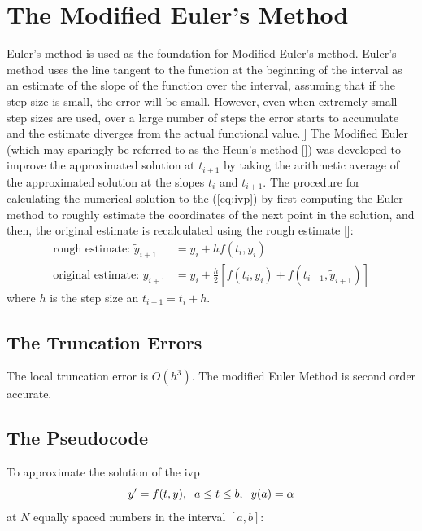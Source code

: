 \documentclass[12pt,oneside]{book}
\begin{document}
	\section{The Modified Euler's Method} \label{m:meul}
		\begin{spacing}{1.2}
			
			Euler's method is used as the foundation for Modified Euler's method. Euler's method uses the line tangent to the function at the beginning of the interval as an estimate of the slope of the function over the interval, assuming that if the step size is small, the error will be small. However, even when extremely small step sizes are used, over a large number of steps the error starts to accumulate and the estimate diverges from the actual functional value.[] \newline
			The Modified Euler (which may sparingly be referred to as the Heun's method []) was developed to improve the approximated solution at $t_{i+1}$ by taking the arithmetic average of the approximated solution at the slopes $t_{i}$ and $t_{i+1}$. \newline
			The procedure for calculating the numerical solution to the (\ref{eq:ivp}) by first computing the Euler method to roughly estimate the coordinates of the next point in the solution, and then, the original estimate is recalculated using the rough estimate []:
				\begin{equation}
					\begin{split}
						\text{rough estimate: } \tilde{y}_{i+1} & = y_{i} + hf(t_{i}, y_{i}) \\
						\text{original estimate: } y_{i+1} & = y_{i} + \frac{h}{2} \left[f(t_{i}, y_{i}) + f(t_{i+1}, \tilde{y}_{i+1}) \right]
					\end{split}
				\end{equation}
				where $ h $ is the step size an $ t_{i+1} = t_{i} + h. $
			
			\subsection*{The Truncation Errors}
				The local truncation error is $ O(h^{3}) $. The modified Euler Method is second order accurate.
			
			\clearpage
			\subsection*{The Pseudocode}
				To approximate the solution of the \ac{ivp} 
				\[ y' = f(t,y), \hspace*{0.2cm} a \leq t \leq b, \hspace*{0.2cm} y(a) = \alpha \]
				at $ N $ equally spaced numbers in the interval $ [a, b]: $
				

\end{spacing}
\end{document}
